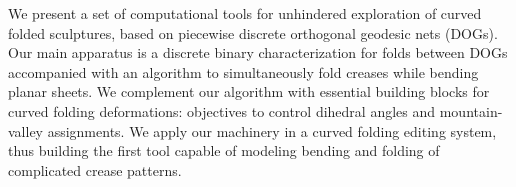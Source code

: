 We present a set of computational tools for unhindered exploration of curved folded sculptures, based on piecewise discrete orthogonal geodesic nets (DOGs). Our main apparatus is a discrete binary characterization for folds between DOGs accompanied with an algorithm to simultaneously fold creases while bending planar sheets. We complement our algorithm with essential building blocks for curved folding deformations: objectives to control dihedral angles and mountain-valley assignments. We apply our machinery in a curved folding editing system, thus building the first tool capable of modeling bending and folding of complicated crease patterns.

